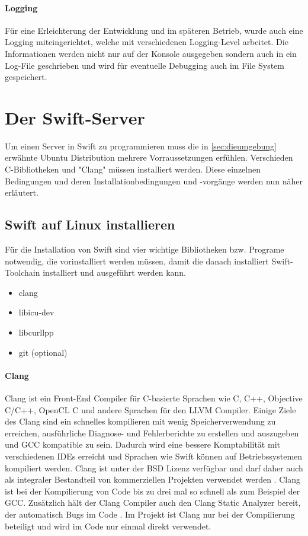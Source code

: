 \paragraph{Logging}
Für eine Erleichterung der Entwicklung und im späteren Betrieb, wurde auch eine Logging miteingerichtet, welche mit verschiedenen Logging-Level arbeitet. Die Informationen werden nicht nur auf der Konsole ausgegeben sondern auch in ein Log-File geschrieben und wird für eventuelle Debugging auch im File System gespeichert.

\section{Der Swift-Server}
\label{sec:derswiftserver}
Um einen Server in Swift zu programmieren muss die in \ref{sec:dieumgebung} erwähnte Ubuntu Distribution mehrere Vorraussetzungen erfühlen. Verschieden C-Bibliotheken und "Clang" müssen installiert werden. Diese einzelnen Bedingungen und deren Installationbedingungen und -vorgänge werden nun näher erläutert.

\subsection{Swift auf Linux installieren}
Für die Installation von Swift sind vier wichtige Bibliotheken bzw. Programe notwendig, die vorinstalliert werden müssen, damit die danach installiert Swift-Toolchain installiert und ausgeführt werden kann. 
\begin{itemize}
	\item clang
	\item libicu-dev
	\item libcurllpp
	\item git (optional)
\end{itemize}

\paragraph{Clang}
\label{para:clang}
Clang ist ein Front-End Compiler für C-basierte Sprachen wie C, C++, Objective C/C++, OpenCL C und andere Sprachen für den LLVM Compiler. Einige Ziele des Clang sind ein schnelles kompilieren mit wenig Speicherverwendung zu erreichen, ausführliche Diagnose- und Fehlerberichte zu erstellen und auszugeben und GCC kompatible zu sein. Dadurch wird eine bessere Komptabilität mit verschiedenen IDEs erreicht und Sprachen wie Swift können auf Betriebssystemen kompiliert werden. Clang ist unter der BSD Lizenz verfügbar und darf daher auch als integraler Bestandteil von kommerziellen Projekten verwendet werden \parencite{clang}. Clang ist bei der Kompilierung von Code bis zu drei mal so schnell als zum Beispiel der GCC. Zusätzlich hält der Clang Compiler auch den Clang Static Analyzer bereit, der automatisch Bugs im Code \parencite{llvm}. Im Projekt ist Clang nur bei der Compilierung beteiligt und wird im Code nur einmal direkt verwendet. 

